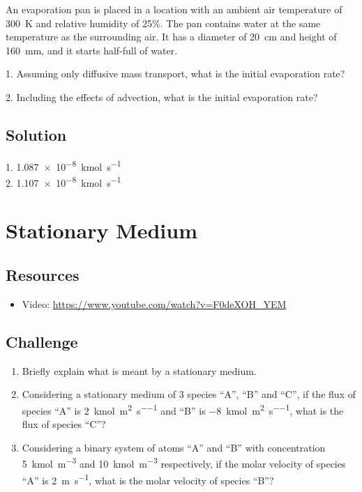 An evaporation pan is placed in a location with an ambient air temperature of \SI{300}{\kelvin} and relative humidity of 25\%. The pan contains water at the same temperature as the surrounding air. It has a diameter of \SI{20}{\cm} and height of \SI{160}{\mm}, and it starts half-full of water.

1. Assuming only diffusive mass transport, what is the initial evaporation rate?

2. Including the effects of advection, what is the initial evaporation rate?


\subsection*{Solution}
1. \SI{1.087e-8}{\kilo\mol\per\second}\\
2. \SI{1.107e-8}{\kilo\mol\per\second}





\newpage
\section{Stationary Medium}

\subsection*{Resources}
\begin{itemize}
    \item Video: \url{https://www.youtube.com/watch?v=F0deXOH_YEM}
\end{itemize}

\subsection*{Challenge}
\begin{enumerate}
    \item Briefly explain what is meant by a stationary medium.
    \item Considering a stationary medium of 3 species ``A'', ``B'' and ``C'', if the flux of species ``A'' is \SI{2}{\kmol\per\square\meter\per\second} and ``B'' is \SI{-8}{\kmol\per\square\meter\per\second}, what is the flux of species ``C''?
    \item Considering a binary system of atoms ``A'' and ``B'' with concentration \SI{5}{\kmol\per\cubic\meter} and \SI{10}{\kmol\per\cubic\meter} respectively, if the molar velocity of species ``A'' is \SI{2}{\meter\per\second}, what is the molar velocity of species ``B''?
\end{enumerate}



